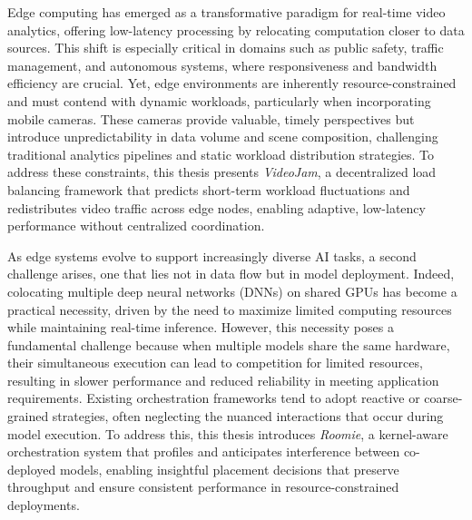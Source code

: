 


Edge computing has emerged as a transformative paradigm for real-time video analytics, offering low-latency processing by relocating computation closer to data sources. This shift is especially critical in domains such as public safety, traffic management, and autonomous systems, where responsiveness and bandwidth efficiency are crucial. Yet, edge environments are inherently resource-constrained and must contend with dynamic workloads, particularly when incorporating mobile cameras. These cameras provide valuable, timely perspectives but introduce unpredictability in data volume and scene composition, challenging traditional analytics pipelines and static workload distribution strategies. To address these constraints, this thesis presents \textit{VideoJam}, a decentralized load balancing framework that predicts short-term workload fluctuations and redistributes video traffic across edge nodes, enabling adaptive, low-latency performance without centralized coordination.

As edge systems evolve to support increasingly diverse AI tasks, a second challenge arises, one that lies not in data flow but in model deployment. Indeed, colocating multiple deep neural networks (DNNs) on shared GPUs has become a practical necessity, driven by the need to maximize limited computing resources while maintaining real-time inference. However, this necessity poses a fundamental challenge because when multiple models share the same hardware, their simultaneous execution can lead to competition for limited resources, resulting in slower performance and reduced reliability in meeting application requirements. Existing orchestration frameworks tend to adopt reactive or coarse-grained strategies, often neglecting the nuanced interactions that occur during model execution. To address this, this thesis introduces \textit{Roomie}, a kernel-aware orchestration system that profiles and anticipates interference between co-deployed models, enabling insightful placement decisions that preserve throughput and ensure consistent performance in resource-constrained deployments.

